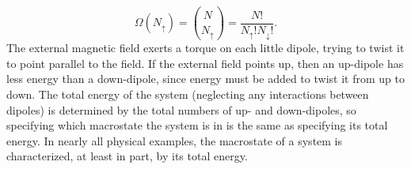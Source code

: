 \documentclass[11pt]{exam}
\begin{document}
\begin{equation}\tag{2.7}
\Omega(N_{\uparrow}) = \binom{N}{N_{\uparrow}} = \frac{N!}{N_{\uparrow}!N_{\downarrow}!}.    
\end{equation}
\hspace*{10mm}The external magnetic field exerts a torque on each little dipole, trying to twist it to point parallel to the field. If the external field points up, then an up-dipole has less energy than a down-dipole, since energy must be added to twist it from up to down. The total energy of the system (neglecting any interactions between dipoles) is determined by the total numbers of up- and down-dipoles, so specifying which macrostate the system is in is the same as specifying its total energy. In nearly all physical examples, the macrostate of a system is characterized, at least in part, by its total energy. 
\newpage
\end{document}
